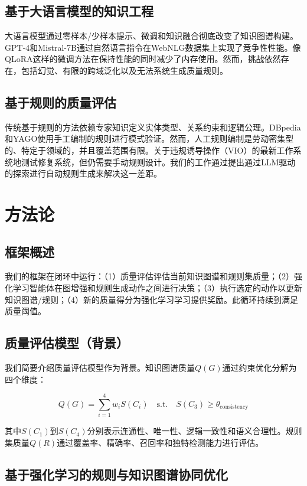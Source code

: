 \documentclass[runningheads]{llncs}
\begin{document}
\subsection{基于大语言模型的知识工程}
大语言模型通过零样本/少样本提示、微调和知识融合彻底改变了知识图谱构建。GPT-4和Mistral-7B通过自然语言指令在WebNLG数据集上实现了竞争性性能。像QLoRA这样的微调方法在保持性能的同时减少了内存使用。然而，挑战依然存在，包括幻觉、有限的跨域泛化以及无法系统生成质量规则。

\subsection{基于规则的质量评估}
传统基于规则的方法依赖专家知识定义实体类型、关系约束和逻辑公理。DBpedia和YAGO使用手工编制的规则进行模式验证。然而，人工规则编制是劳动密集型的、特定于领域的，并且覆盖范围有限。关于违规诱导操作（VIO）的最新工作系统地测试修复系统，但仍需要手动规则设计。我们的工作通过提出通过LLM驱动的探索进行自动规则生成来解决这一差距。

\section{方法论}

\subsection{框架概述}
我们的框架在闭环中运行：（1）质量评估评估当前知识图谱和规则集质量；（2）强化学习智能体在图增强和规则生成动作之间进行决策；（3）执行选定的动作以更新知识图谱/规则；（4）新的质量得分为强化学习学习提供奖励。此循环持续到满足质量阈值。

\subsection{质量评估模型（背景）}
我们简要介绍质量评估模型作为背景。知识图谱质量$Q(G)$通过约束优化分解为四个维度：

\begin{equation}
\label{eq:kg_quality}
Q(G) = \sum_{i=1}^{4} w_i S(C_i) \quad \text{s.t.} \quad S(C_3) \ge \theta_{\text{consistency}}
\end{equation}

其中$S(C_1)$到$S(C_4)$分别表示连通性、唯一性、逻辑一致性和语义合理性。规则集质量$Q(R)$通过覆盖率、精确率、召回率和独特检测能力进行评估。

\subsection{基于强化学习的规则与知识图谱协同优化}
\label{subsec:rl_co_optimization}
\end{document}
